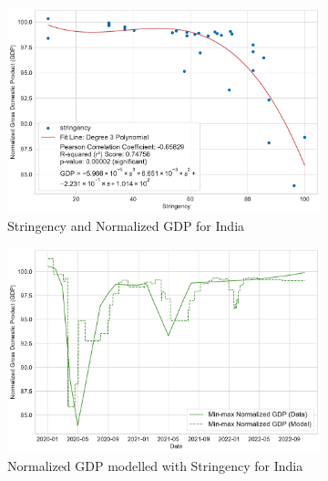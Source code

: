 \documentclass[tikz,fleqn,12pt]{wlscirep}
\begin{document}
\begin{figure}[htbp!]
  \centering
  \begin{subfigure}[t]{0.48\textwidth}
    \centering
    \includegraphics[width=\linewidth]{images/stringency_vs_gdp_IND.pdf}
    \caption{Stringency and Normalized GDP for India}
    \label{fig:stringency_vs_gdp_IND}
  \end{subfigure}
  \hfill
  \begin{subfigure}[t]{0.48\textwidth}
    \centering
    \includegraphics[width=\linewidth]{images/gdp_modelled_with_stringency_IND.pdf}
    \caption{Normalized GDP modelled with Stringency for India}
    \label{fig:gdp_modelled_with_stringency_IND}
  \end{subfigure}
  \begin{subfigure}[t]{0.48\textwidth}
    \centering

\end{subfigure}
\end{figure}
\end{document}
